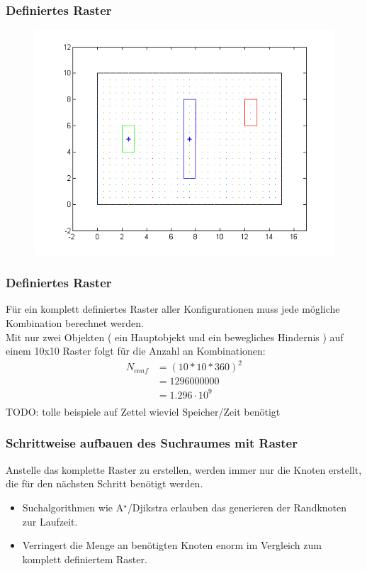 \documentclass[final]{beamer}
\begin{document}
\begin{frame}
\frametitle{Definiertes Raster}
\begin{figure} 
\centering
\includegraphics[scale=0.4]{../thesis/plotGridRot}
\end{figure}
\end{frame}

\begin{frame}
\frametitle{Definiertes Raster}
Für ein komplett definiertes Raster aller Konfigurationen muss jede mögliche Kombination berechnet werden.\\
Mit nur zwei Objekten ( ein Hauptobjekt und ein bewegliches Hindernis ) auf einem 10x10 Raster folgt für die Anzahl an Kombinationen:
\begin{align*}
N_{conf} &= (10*10*360)^2 \\
	&=   1296000000\\
	&= 1.296 \cdot 10^9\\
\end{align*}
TODO: tolle beispiele auf Zettel wieviel Speicher/Zeit benötigt
\end{frame}



\begin{frame}
\frametitle{Schrittweise aufbauen des Suchraumes mit Raster}
Anstelle das komplette Raster zu erstellen, werden immer nur die Knoten erstellt, die für den nächsten Schritt benötigt werden.
\begin{itemize}
\item Suchalgorithmen wie A$^\star$/Djikstra erlauben das generieren der Randknoten zur Laufzeit.
\item Verringert die Menge an benötigten Knoten enorm im Vergleich zum komplett definiertem Raster.
\end{itemize}
\end{frame}
\end{document}
